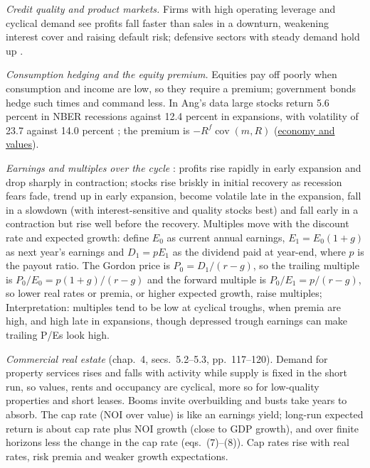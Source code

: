 \begin{qfmethod}\label{meth:cycle-equities-property}
 \emph{Credit quality and product markets.} Firms with high operating leverage and cyclical demand see profits fall faster than sales in a downturn, weakening interest cover and raising default risk; defensive sectors with steady demand hold up \citep[chap.~6, sec.~2.2, pp.~284--292]{economics-investment-decision-makers-2013}.

\emph{Consumption hedging and the equity premium.} Equities pay off poorly when consumption and income are low, so they require a premium; government bonds hedge such times and command less. In Ang's data large stocks return 5.6 percent in NBER recessions against 12.4 percent in expansions, with volatility of 23.7 against 14.0 percent \citep[chap.~7, sec.~2.1, Table~7.2, pp.~215--217]{s7-ang}; the premium is $-R^f\operatorname{cov}(m,R)$ (\hyperref[res:economy-discount-rates-cash-flows]{economy and values}).

\emph{Earnings and multiples over the cycle} \citep[chap.~3, sec.~3.4.1, pp.~62--64]{portfolio-management-in-practice-v1-2020}: profits rise rapidly in early expansion and drop sharply in contraction; stocks rise briskly in initial recovery as recession fears fade, trend up in early expansion, become volatile late in the expansion, fall in a slowdown (with interest-sensitive and quality stocks best) and fall early in a contraction but rise well before the recovery. Multiples move with the discount rate and expected growth: define $E_0$ as current annual earnings, $E_1=E_0(1+g)$ as next year's earnings and $D_1=pE_1$ as the dividend paid at year-end, where $p$ is the payout ratio. The Gordon price is $P_0=D_1/(r-g)$, so the trailing multiple is $P_0/E_0=p(1+g)/(r-g)$ and the forward multiple is $P_0/E_1=p/(r-g)$, so lower real rates or premia, or higher expected growth, raise multiples; Interpretation: multiples tend to be low at cyclical troughs, when premia are high, and high late in expansions, though depressed trough earnings can make trailing P/Es look high.

\emph{Commercial real estate} (chap.~4, secs.~5.2--5.3, pp.~117--120). Demand for property services rises and falls with activity while supply is fixed in the short run, so values, rents and occupancy are cyclical, more so for low-quality properties and short leases. Booms invite overbuilding and busts take years to absorb. The cap rate (NOI over value) is like an earnings yield; long-run expected return is about cap rate plus NOI growth (close to GDP growth), and over finite horizons less the change in the cap rate (eqs.~(7)--(8)). Cap rates rise with real rates, risk premia and weaker growth expectations.


\end{qfmethod}
